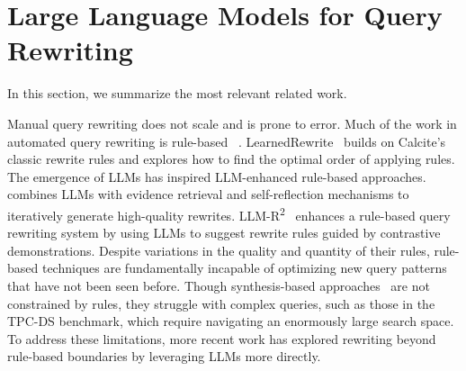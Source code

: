 \vspace{-1mm}

\section{Large Language Models for Query Rewriting}
\label{gen:sec:related}

In this section, we summarize the most relevant related work.

 Manual query rewriting does not scale and is prone to error. 
Much of the work in automated query rewriting is rule-based ~\cite{pirahesh1992extensible,graefe1987rule,ahmed2006cost,levy1994query,muralikrishna1992improved,seshadri1996cost}.  LearnedRewrite~\cite{LR} builds on Calcite’s classic rewrite rules and explores how to find the optimal order of applying rules.  The emergence of LLMs has inspired LLM-enhanced rule-based approaches. \rbot~\cite{sun2024r} combines LLMs with evidence retrieval and self-reflection mechanisms to iteratively generate high-quality rewrites.   \textsc{LLM-R\textsuperscript{2}}~\cite{li2024llm} enhances a rule-based query rewriting system by using LLMs to suggest rewrite rules guided by contrastive demonstrations.
Despite variations in the quality and quantity of their rules,  rule-based techniques are fundamentally incapable of
optimizing new query patterns that have not been seen before. Though synthesis-based approaches~\cite{dong2023slabcity} are not constrained by rules,  they struggle with complex queries, such as those in the TPC-DS benchmark, which require navigating an enormously large search space. To address these limitations, more recent work has explored rewriting beyond rule-based boundaries by leveraging LLMs more directly. 


